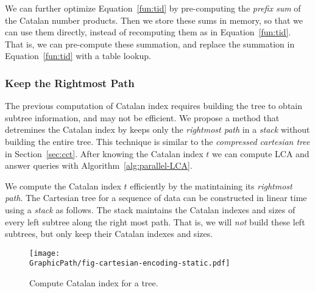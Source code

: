 % 



We can further optimize Equation~\ref{fun:tid} by pre-computing the
{\em prefix sum} of the Catalan number products.  Then we store these
sums in memory, so that we can use them directly, instead of
recomputing them as in Equation~\ref{fun:tid}.  That is, we can
pre-compute these summation, and replace the summation in
Equation~\ref{fun:tid} with a table lookup.


\subsubsection{Keep the Rightmost Path}

The previous computation of Catalan index requires building the tree
to obtain subtree information, and may not be efficient.  We propose a
method that detremines the Catalan index by keeps only the {\em
  rightmost path} in a {\em stack} without building the entire tree.
This technique is similar to the {\em compressed cartesian tree} in
Section~\ref{sec:cct}.  After knowing the Catalan index $t$ we can
compute LCA and answer queries with Algorithm~\ref{alg:parallel-LCA}.

We compute the Catalan index $t$ efficiently by the matintaining its
{\em rightmost path}.  The Cartesian tree for a sequence of data can
be constructed in linear time using a {\em stack} as follows.  The
stack maintains the Catalan indexes and sizes of every left subtree
along the right most path.  That is, we will {\em not} build these
left subtrees, but only keep their Catalan indexes and sizes.

\begin{figure}[!thb]
  \centering
  \texttt{[image: \\GraphicPath/fig-cartesian-encoding-static.pdf]}
  \caption{Compute Catalan index for a tree.}
  \label{fig:fig-cartesian-encoding-static}
\end{figure}

